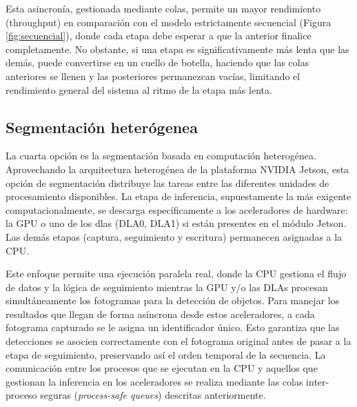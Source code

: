 \documentclass[11pt,spanish,listoffigures,listoftables]{tfgetsinf}
\begin{document}
Esta asincronía, gestionada mediante colas, permite un mayor rendimiento (throughput) en comparación con el modelo estrictamente secuencial (Figura \ref{fig:secuencial}), donde cada etapa debe esperar a que la anterior finalice completamente. No obstante, si una etapa es significativamente más lenta que las demás, puede convertirse en un cuello de botella, haciendo que las colas anteriores se llenen y las posteriores permanezcan vacías, limitando el rendimiento general del sistema al ritmo de la etapa más lenta.


\subsection{Segmentación heterógenea} \label{sub:segmentacion_hardware}
La cuarta opción es la segmentación basada en computación heterogénea. Aprovechando la arquitectura heterogénea de la plataforma NVIDIA Jetson, esta opción de segmentación distribuye las tareas entre las diferentes unidades de procesamiento disponibles. La etapa de inferencia, supuestamente la más exigente computacionalmente, se descarga específicamente a los aceleradores de hardware: la GPU o uno de los \glspl{dla} (DLA0, DLA1) si están presentes en el módulo Jetson. Las demás etapas (captura, seguimiento y escritura) permanecen asignadas a la CPU.

Este enfoque permite una ejecución paralela real, donde la CPU gestiona el flujo de datos y la lógica de seguimiento mientras la GPU y/o las DLAs procesan simultáneamente los fotogramas para la detección de objetos. Para manejar los resultados que llegan de forma asíncrona desde estos aceleradores, a cada fotograma capturado se le asigna un identificador único. Esto garantiza que las detecciones se asocien correctamente con el fotograma original antes de pasar a la etapa de seguimiento, preservando así el orden temporal de la secuencia. La comunicación entre los procesos que se ejecutan en la CPU y aquellos que gestionan la inferencia en los aceleradores se realiza mediante las colas inter-proceso seguras (\textit{process-safe queues}) descritas anteriormente.
\end{document}
